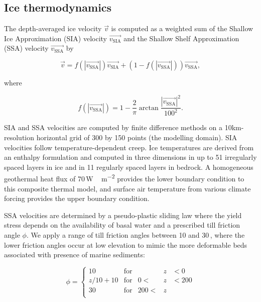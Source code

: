 \subsection{Ice thermodynamics}

The depth-averaged ice velocity $\vec{v}$ is computed as a weighted sum of the Shallow Ice Approximation (SIA) velocity $\vec{v_{\mathrm{SIA}}}$ and the Shallow Shelf Approximation (SSA) velocity $\vec{v_{\mathrm{SSA}}}$ \citep{bueler-brown-2009} by

\begin{equation}
	\vec{v} = f(|\vec{v_{\mathrm{SSA}}}|)\vec{v_{\mathrm{SIA}}}
  + (1-f(|\vec{v_{\mathrm{SSA}}}|))\vec{v_{\mathrm{SSA}}},
\end{equation}

where

\begin{equation}
	f(|\vec{v_{\mathrm{SSA}}}|) = 1
	- \frac{2}{\pi}\arctan{\frac{|\vec{v_{\mathrm{SSA}}}|^2}{100^2}}.
\end{equation}

SIA and SSA velocities are computed by finite difference methods on a 10km-resolution horizontal grid of 300 by 150 points (the modelling domain). SIA velocities follow temperature-dependent creep\needref. Ice temperatures are derived from an enthalpy formulation \citep{aschwanden-etal-2012} and computed in three dimensions in up to 51 irregularly spaced layers in ice and in 11 regularly spaced layers in bedrock. A homogeneous geothermal heat flux of 70\,\unit{W\,m^{-2}} provides the lower boundary condition to this composite thermal model, and surface air temperature from various climate forcing provides the upper boundary condition.

SSA velocities are determined by a pseudo-plastic sliding law where the yield stress depends on the availability of basal water and a prescribed till friction angle $\phi$. We apply a range of till friction angles between 10 and 30\,\degree, where the lower friction angles occur at low elevation to mimic the more deformable beds associated with presence of marine sediments:

\begin{equation}
	\phi = \left\{\begin{array}{llrll}
		10      & \mathrm{for} &      &z&<  0 \\
		z/10+10 & \mathrm{for} &   0 <&z&<200 \\
		30      & \mathrm{for} & 200 <&z&     \\
	\end{array}\right.
\end{equation}

